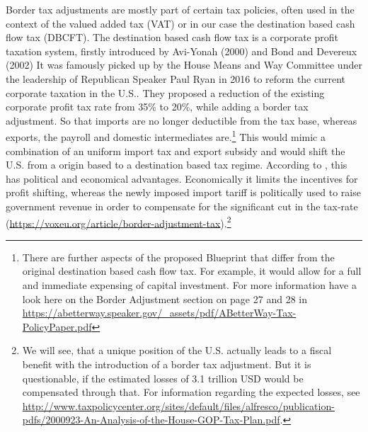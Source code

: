 Border tax adjustments are mostly part of certain tax policies, often used in the context of the valued added tax (VAT) or in our case the destination based cash flow tax (DBCFT). The destination based cash flow tax is a corporate profit taxation system, firstly introduced by Avi-Yonah (2000) and Bond and Devereux (2002)
It was famously picked up by the House Means and Way Committee under the leadership of Republican Speaker Paul Ryan in 2016 to reform the current corporate taxation in the U.S.. They proposed a reduction of the existing corporate profit tax rate from 35\% to 20\%, while adding a border tax adjustment. So that imports are no longer deductible from the tax base, whereas exports, the payroll and domestic intermediates are.\footnote{There are further aspects of the proposed Blueprint that differ from the original destination based cash flow tax. For example, it would allow for a full and immediate expensing of capital investment. For more information have a look here on the Border Adjustment section on page 27 and 28 in \url{https://abetterway.speaker.gov/_assets/pdf/ABetterWay-Tax-PolicyPaper.pdf}} This would mimic a combination of an uniform import tax and export subsidy and would shift the U.S. from a origin based to a destination based tax regime. According to \cite{auerbach2017destination}, this has political and economical advantages. Economically it limits the incentives for profit shifting, whereas the newly imposed import tariff is politically used to raise government revenue in order to compensate for the significant cut in the tax-rate (\url{https://voxeu.org/article/border-adjustment-tax}).\footnote{We will see, that a unique position of the U.S. actually leads to a fiscal benefit with the introduction of a border tax adjustment. But it is questionable, if the estimated losses of 3.1 trillion USD would be compensated through that. For information regarding the expected losses, see \url{http://www.taxpolicycenter.org/sites/default/files/alfresco/publication-pdfs/2000923-An-Analysis-of-the-House-GOP-Tax-Plan.pdf}.} 



